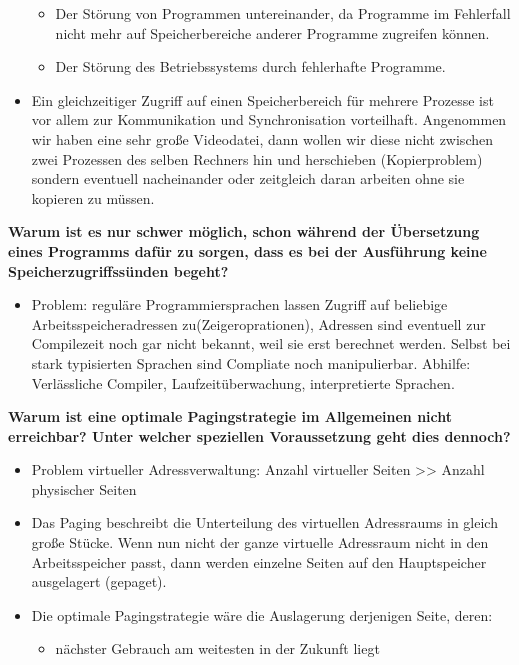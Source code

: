 \documentclass[a4paper]{article}
\begin{document}
\begin{description*}
\begin{itemize}
\begin{itemize}
                  \item Der Störung von Programmen untereinander, da Programme im Fehlerfall nicht mehr auf Speicherbereiche anderer Programme zugreifen können.
                  \item Der Störung des Betriebssystems durch fehlerhafte Programme.
              \end{itemize}
        \item Ein gleichzeitiger Zugriff auf einen Speicherbereich für mehrere Prozesse ist vor allem zur Kommunikation und Synchronisation vorteilhaft. Angenommen wir haben eine sehr große Videodatei, dann wollen wir diese nicht zwischen zwei Prozessen des selben Rechners hin und herschieben (Kopierproblem) sondern eventuell nacheinander oder zeitgleich daran arbeiten ohne sie kopieren zu müssen.
    \end{itemize}
    \item \textbf{Warum ist es nur schwer möglich, schon während der Übersetzung eines Programms dafür zu sorgen, dass es bei der Ausführung keine Speicherzugriffssünden begeht?}
    \begin{itemize}
        \item Problem: reguläre Programmiersprachen lassen Zugriff auf beliebige Arbeitsspeicheradressen zu(Zeigeroprationen), Adressen sind eventuell zur Compilezeit noch gar nicht bekannt, weil sie erst berechnet werden. Selbst bei stark typisierten Sprachen sind Compliate noch manipulierbar.
              Abhilfe: Verlässliche Compiler, Laufzeitüberwachung, interpretierte Sprachen.
    \end{itemize}
    \item \textbf{Warum ist eine optimale Pagingstrategie im Allgemeinen nicht erreichbar? Unter welcher speziellen Voraussetzung geht dies dennoch?}
    \begin{itemize}
        \item Problem virtueller Adressverwaltung: Anzahl virtueller Seiten >> Anzahl physischer Seiten
        \item Das Paging beschreibt die Unterteilung des virtuellen Adressraums in gleich große Stücke. Wenn nun nicht der ganze virtuelle Adressraum nicht in den Arbeitsspeicher passt, dann werden einzelne Seiten auf den Hauptspeicher ausgelagert (gepaget).
        \item Die optimale Pagingstrategie wäre die Auslagerung derjenigen Seite, deren:
              \begin{itemize}
                  \item nächster Gebrauch am weitesten in der Zukunft liegt

\end{itemize}
\end{itemize}
\end{description*}
\end{document}
